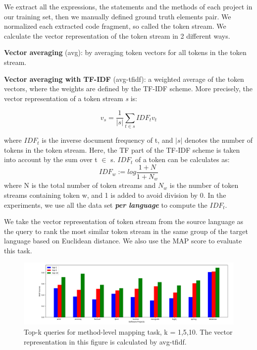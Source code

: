 We extract all the expressions, the statements and the methods of each project in our training set, then we manually defined ground truth elements pair. We normalized each extracted code fragment, so called the token stream. We calculate the vector representation of the token stream in 2 different ways.

\textbf{Vector averaging} (avg): by averaging token vectors for all tokens in the token stream.

\textbf{Vector averaging with TF-IDF} (avg-tfidf): a weighted average of the token vectors, where the weights are defined by the TF-IDF scheme. More precisely, the vector representation of a token stream \textit{s} is:

\begin{displaymath}
v_{s} = \frac{1}{|s|} \sum_{t \in s} IDF_{t}v_{t}
\end{displaymath}

where \begin{math}IDF_{t} \end{math} is the inverse document frequency of t, and \begin{math}|s|\end{math} denotes the number of tokens in the token stream. Here, the TF part of the TF-IDF scheme is taken into account by the sum over t \begin{math}\in\end{math} s. \begin{math}IDF_{t} \end{math} of a token can be calculates as:
\begin{displaymath}
IDF_{w} := log \frac{1 + N}{1 + N_{w}}
\end{displaymath}
where N is the total number of token streams and \begin{math}N_{w}\end{math} is the number of token streams containing token w, and 1 is added to avoid division by 0. In the experiments, we use all the data set \textbf{\textit{per language}} to compute the \begin{math}IDF_{t} \end{math}.

We take the vector representation of token stream from the source language as the query to rank the most similar token stream in the same group of the target language based on Euclidean distance. We also use the MAP score to evaluate this task.


\begin{figure}[t!]
	\centering
	\includegraphics[width=1.05\textwidth]{top_k}
	\caption{Top-k queries for method-level mapping task, k = 1,5,10. The vector representation in this figure is calculated by avg-tfidf.}
	\label{fig:top_k}
\end{figure}

